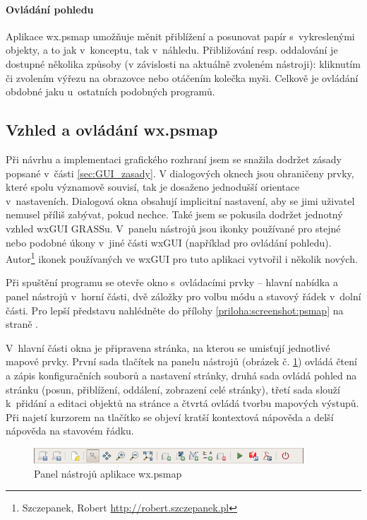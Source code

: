 \documentclass[a4paper,12pt,draft]{article}
\begin{document}
\paragraph*{Ovládání pohledu}
Aplikace wx.psmap umožňuje měnit přiblížení a posunovat papír
s~vykreslenými objekty, a to jak v~konceptu, tak v~náhledu. Přibližování
resp. oddalování je dostupné několika způsoby (v závislosti na aktuálně zvoleném
nástroji): kliknutím či zvolením výřezu na obrazovce nebo otáčením kolečka myši.
Celkově je ovládání obdobné jaku u~ostatních podobných programů.


\subsection{Vzhled a ovládání wx.psmap}

Při návrhu a implementaci grafického rozhraní jsem se snažila dodržet
zásady popsané v~části \ref{sec:GUI_zasady}.
V dialogových oknech jsou ohraničeny prvky, které spolu význa\-mově souvisí,
tak je dosaženo jednodušší orientace v~nastaveních. Dialogová okna obsahují
 implicitní nastavení, aby se jimi uživatel nemusel příliš zabývat, pokud
nechce.
Také jsem se pokusila dodržet jednotný vzhled wxGUI GRASSu. V~panelu nástrojů
jsou ikonky používané pro stejné nebo podobné úkony v~jiné části wxGUI
(například pro ovládání pohledu).
Autor\footnote{%
Szczepanek, Robert \url{http://robert.szczepanek.pl}} ikonek používaných ve
wxGUI pro tuto aplikaci vytvořil i několik nových.



Při spuštění programu se otevře okno s~ovládacími prvky -- hlavní
nabídka a panel nástrojů v~horní části, dvě záložky pro volbu módu
a stavový řádek v~dolní části. Pro lepší představu nahlédněte do přílohy
\ref{priloha:screenshot:psmap} na straně \pageref{priloha:screenshot:psmap}.



V~hlavní části okna je připravena stránka, na kterou se umisťují
jednotlivé mapové prvky. První sada tlačítek na panelu nástrojů
(obrázek č. \ref{fig:psmap_toolbar})
ovládá čtení a zápis konfiguračních souborů a nastavení stránky, druhá sada
ovládá pohled na stránku (posun, přiblížení, oddálení, zobrazení
celé stránky), třetí sada slouží k~při\-dání a editaci objektů na
stránce a čtvrtá ovládá tvorbu mapových výstupů. Při
najetí kurzorem na tlačítko se objeví kratší kontextová nápověda
a delší nápověda na stavovém řádku.
\begin{figure}[h!]
  \centering
  \includegraphics[width=0.9\textwidth]{./GUI_screenshots/psmap_toolbar.png}
  \caption{Panel nástrojů aplikace wx.psmap}
  \label{fig:psmap_toolbar}
\end{figure}
\end{document}
